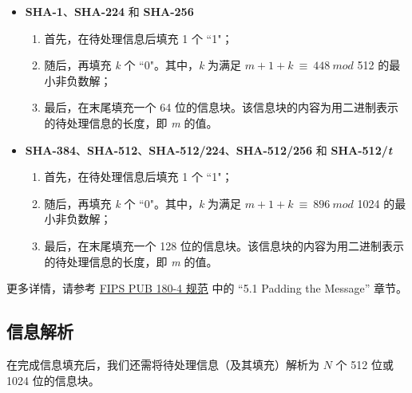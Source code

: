 \documentclass[main\_\_CN.tex]{subfiles}
\begin{document}
\begin{itemize}
    \item \textbf{SHA-1}、\textbf{SHA-224} 和 \textbf{SHA-256}
        \begin{enumerate}
        \item 首先，在待处理信息后填充 1 个 ``1"；
        \item 随后，再填充 {\it{k}} 个 ``0"。其中，{\it{k}} 为满足 \begin{math}m + 1 + k \ {\equiv} \ 448 \ mod \end{math} 512 的最小非负数解；
        \item 最后，在末尾填充一个 64 位的信息块。该信息块的内容为用二进制表示的待处理信息的长度，即 {\it{m}} 的值。
        \end{enumerate}
    \item \textbf{SHA-384}、\textbf{SHA-512}、\textbf{SHA-512/224}、\textbf{SHA-512/256} 和 \textbf{SHA-512/{\it{t}}}
        \begin{enumerate}
        \item 首先，在待处理信息后填充 1 个 ``1"；
        \item 随后，再填充 {\it{k}} 个 ``0"。其中，{\it{k}} 为满足 \begin{math}m + 1 + k \ {\equiv} \ 896 \ mod \end{math} 1024 的最小非负数解；
        \item 最后，在末尾填充一个 128 位的信息块。该信息块的内容为用二进制表示的待处理信息的长度，即 {\it{m}} 的值。
        \end{enumerate}
\end{itemize}

更多详情，请参考 \href{https://doi.org/10.6028/NIST.FIPS.180-4}{FIPS PUB 180-4 规范} 中的 “5.1 Padding the Message” 章节。

\subsection{信息解析}\label{parsingmessage}

在完成信息填充后，我们还需将待处理信息（及其填充）解析为 \begin{math}N\end{math} 个 512 位或 1024 位的信息块。
\end{document}
